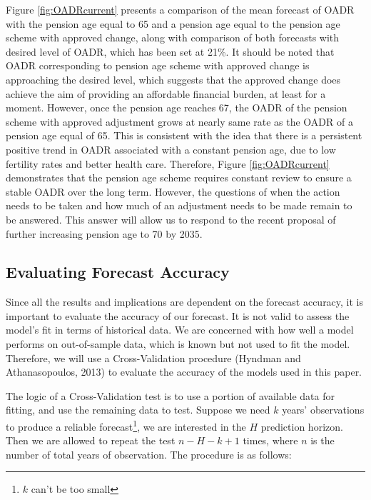 \documentclass[11pt,a4paper,]{article}
\begin{document}
Figure \ref{fig:OADRcurrent} presents a comparison of the mean forecast of OADR with the pension age equal to 65 and a pension age equal to the pension age scheme with approved change, along with comparison of both forecasts with desired level of OADR, which has been set at 21\%. It should be noted that OADR corresponding to pension age scheme with approved change is approaching the desired level, which suggests that the approved change does achieve the aim of providing an affordable financial burden, at least for a moment. However, once the pension age reaches 67, the OADR of the pension scheme with approved adjustment grows at nearly same rate as the OADR of a pension age equal of 65. This is consistent with the idea that there is a persistent positive trend in OADR associated with a constant pension age, due to low fertility rates and better health care. Therefore, Figure \ref{fig:OADRcurrent} demonstrates that the pension age scheme requires constant review to ensure a stable OADR over the long term. However, the questions of when the action needs to be taken and how much of an adjustment needs to be made remain to be answered. This answer will allow us to respond to the recent proposal of further increasing pension age to 70 by 2035.

\hypertarget{sec:accuracy}{%
\subsection{Evaluating Forecast Accuracy}\label{sec:accuracy}}

Since all the results and implications are dependent on the forecast accuracy, it is important to evaluate the accuracy of our forecast. It is not valid to assess the model's fit in terms of historical data. We are concerned with how well a model performs on out-of-sample data, which is known but not used to fit the model. Therefore, we will use a Cross-Validation procedure (Hyndman and Athanasopoulos, 2013) to evaluate the accuracy of the models used in this paper.

The logic of a Cross-Validation test is to use a portion of available data for fitting, and use the remaining data to test. Suppose we need \(k\) years' observations to produce a reliable forecast\footnote{$k$ can't be too small}, we are interested in the \(H\) prediction horizon. Then we are allowed to repeat the test \(n-H-k+1\) times, where \(n\) is the number of total years of observation. The procedure is as follows:
\end{document}
